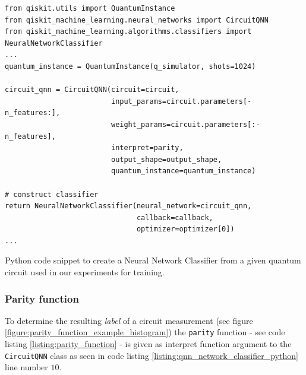 \begin{listing}[!ht]
    \begin{verbatim}
from qiskit.utils import QuantumInstance
from qiskit_machine_learning.neural_networks import CircuitQNN
from qiskit_machine_learning.algorithms.classifiers import NeuralNetworkClassifier
...
quantum_instance = QuantumInstance(q_simulator, shots=1024)

circuit_qnn = CircuitQNN(circuit=circuit,
                         input_params=circuit.parameters[-n_features:],
                         weight_params=circuit.parameters[:-n_features],
                         interpret=parity,
                         output_shape=output_shape,
                         quantum_instance=quantum_instance)

# construct classifier
return NeuralNetworkClassifier(neural_network=circuit_qnn,
                               callback=callback,
                               optimizer=optimizer[0])
...

    \end{verbatim}
    \caption{Python code snippet to create a Neural Network Classifier from a given quantum circuit used in our experiments for training.}
    \label{listing:qnn_network_classifier_python}
\end{listing}

\subsubsection{Parity function}
\label{subsubsection:parity_function_explained}
To determine the resulting \textit{label} of a circuit measurement (see figure \ref{figure:parity_function_example_histogram}) the \texttt{parity} function - see code listing \ref{listing:parity_function} - is given as interpret function argument to the \texttt{CircuitQNN} class as seen in code listing \ref{listing:qnn_network_classifier_python} line number $10$. 

